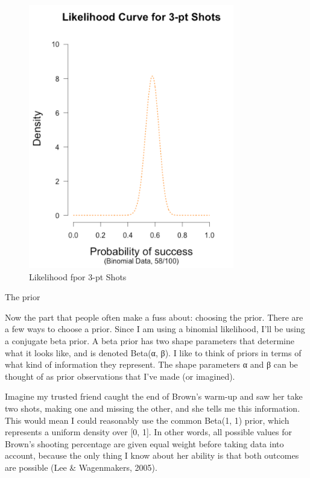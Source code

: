 \begin{figure}[h]
    \centering
\includegraphics[width=0.8\textwidth]{pic/p05c03-snip05.png}
    \caption{Likelihood fpor 3-pt Shots}
    \label{fig:p05c03-snip05}
\end{figure}


The prior

Now the part that people often make a fuss about: choosing the prior. There are a few ways to choose a prior. Since I am using a binomial likelihood, I'll be using a conjugate beta prior. A beta prior has two shape parameters that determine what it looks like, and is denoted Beta(α, β). I like to think of priors in terms of what kind of information they represent. The shape parameters α and β can be thought of as prior observations that I've made (or imagined).

Imagine my trusted friend caught the end of Brown's warm-up and saw her take two shots, making one and missing the other, and she tells me this information. This would mean I could reasonably use the common Beta(1, 1) prior, which represents a uniform density over [0, 1]. In other words, all possible values for Brown's shooting percentage are given equal weight before taking data into account, because the only thing I know about her ability is that both outcomes are possible (Lee & Wagenmakers, 2005).

